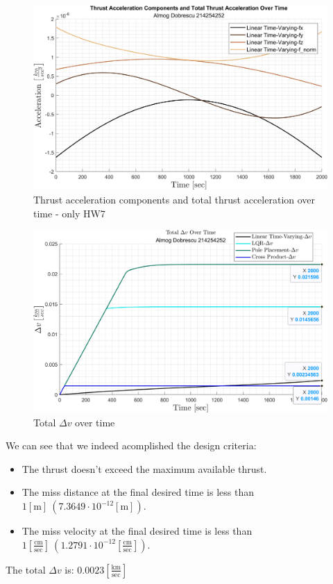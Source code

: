 \documentclass[11pt, a4paper]{article}
\begin{document}
\begin{figure}[H]
    \centering
    \includegraphics[width=1\textwidth]{images/graph4.png}
    \caption{Thrust acceleration components and total thrust acceleration over time - only HW7}
    \label{fig:accel_over_time_hw7}
\end{figure}
\begin{figure}[H]
    \centering
    \includegraphics[width=1\textwidth]{images/graph5.png}
    \caption{Total $\Delta v$ over time}
    \label{fig:delta_v_over_time}
\end{figure}
We can see that we indeed acomplished the design criteria:
\begin{itemize}
    \item The thrust doesn't exceed the maximum available thrust.
    \item The miss distance at the final desired time is less than $1[\mathrm{m}]\ \left(7.3649\cdot10^{-12}\left[\mathrm{m}\right]\right)$.
    \item The miss velocity at the final desired time is less than $1\left[\displaystyle\frac{\mathrm{cm}}{\mathrm{sec}}\right]\ \left(1.2791\cdot10^{-12}\left[\displaystyle\frac{\mathrm{cm}}{\mathrm{sec}}\right]\right)$.
\end{itemize}

The total $\Delta v$ is: $0.0023\left[\displaystyle\frac{\mathrm{km}}{\mathrm{sec}}\right]$
\end{document}
